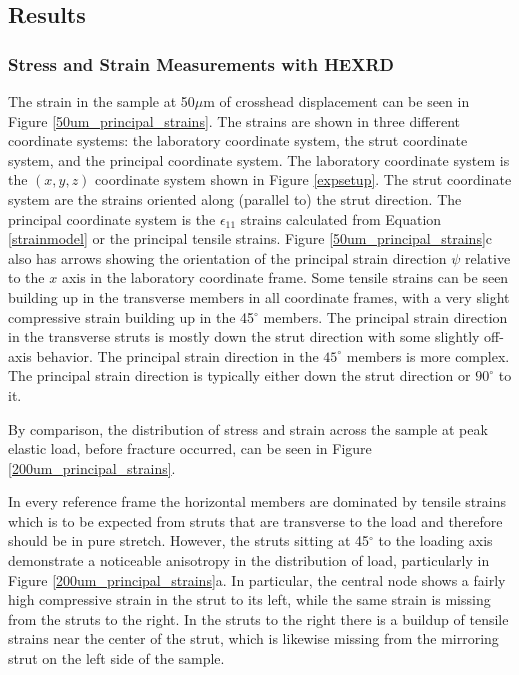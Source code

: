 \subsection{Results}
\subsubsection{Stress and Strain Measurements with HEXRD}
The strain in the sample at 50$\mu$m of crosshead displacement can be seen in Figure \ref{50um_principal_strains}. The strains are shown in three different coordinate systems: the laboratory coordinate system, the strut coordinate system, and the principal coordinate system. The laboratory coordinate system is the $(x,y,z)$ coordinate system shown in Figure \ref{expsetup}. The strut coordinate system are the strains oriented along (parallel to) the strut direction. The principal coordinate system is the $\epsilon_{11}$ strains calculated from Equation \ref{strainmodel} or the principal tensile strains. Figure \ref{50um_principal_strains}c also has arrows showing the orientation of the principal strain direction $\psi$ relative to the $x$ axis in the laboratory coordinate frame. Some tensile strains can be seen building up in the transverse members in all coordinate frames, with a very slight compressive strain building up in the 45$^\circ$ members. The principal strain direction in the transverse struts is mostly down the strut direction with some slightly off-axis behavior. The principal strain direction in the $45^\circ$ members is more complex. The principal strain direction is typically either down the strut direction or $90^\circ$ to it. 

By comparison, the distribution of stress and strain across the sample at peak elastic load, before fracture occurred, can be seen in Figure \ref{200um_principal_strains}. 

In every reference frame the horizontal members are dominated by tensile strains which is to be expected from struts that are transverse to the load and therefore should be in pure stretch. However, the struts sitting at 45$^\circ$ to the loading axis demonstrate a noticeable anisotropy in the distribution of load, particularly in Figure \ref{200um_principal_strains}a. In particular, the central node shows a fairly high compressive strain in the strut to its left, while the same strain is missing from the struts to the right. In the struts to the right there is a buildup of tensile strains near the center of the strut, which is likewise missing from the mirroring strut on the left side of the sample.

